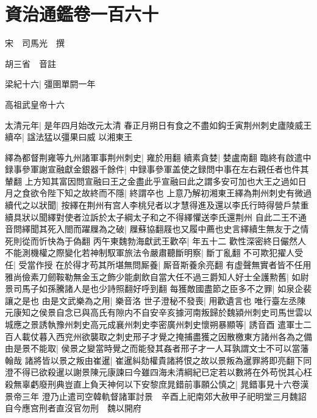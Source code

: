 \section{資治通鑑卷一百六十}
宋　司馬光　撰

胡三省　音註

梁紀十六|{
	彊圉單閼一年}


高祖武皇帝十六

太清元年|{
	是年四月始改元太清}
春正月朔日有食之不盡如鈎壬寅荆州刺史廬陵威王續卒|{
	諡法猛以彊果曰威}
以湘東王

繹為都督荆雍等九州諸軍事荆州刺史|{
	雍於用翻}
續素貪婪|{
	婪盧南翻}
臨終有啟遣中録事參軍謝宣融獻金銀器千餘件|{
	中録事參軍盖使之録問中事在左右親任者也件其輦翻}
上方知其富因問宣融曰王之金盡此乎宣融曰此之謂多安可加也大王之過如日月之食欲令陛下知之故終而不隱|{
	終謂卒也}
上意乃解初湘東王繹為荆州刺史有微過續代之以狀聞|{
	按繹在荆州有宫人李桃兒者以才慧得進及還以李氏行時得營戶禁重續具狀以聞繹對使者泣訴於太子綱太子和之不得繹懼送李氏還荆州}
自此二王不通音問繹聞其死入閤而躍屧為之破|{
	屧蘇協翻屐也又履中薦也史言繹續生無友于之情死則從而忻快為于偽翻}
丙午東魏勃海獻武王歡卒|{
	年五十二}
歡性深密終日儼然人不能測機權之際變化若神制馭軍旅法令嚴肅聽斷明察|{
	斷丁亂翻}
不可欺犯擢人受任|{
	受當作授}
在於得才苟其所堪無問厮養|{
	厮音斯養余亮翻}
有虚聲無實者皆不任用雅尚儉素刀劒鞍勒無金玉之飾少能劇飲自當大任不過三爵知人好士全護勲舊|{
	如尉景司馬子如孫騰諸人是也少詩照翻好呼到翻}
每獲敵國盡節之臣多不之罪|{
	如泉企裴讓之是也}
由是文武樂為之用|{
	樂音洛}
世子澄秘不發喪|{
	用歡遺言也}
唯行臺左丞陳元康知之侯景自念已與高氏有隙内不自安辛亥據河南叛歸於魏潁州刺史司馬世雲以城應之景誘執豫州刺史高元成襄州刺史李密廣州刺史懷朔暴顯等|{
	誘音酉}
遣軍士二百人載仗暮入西兖州欲襲取之刺史邢子才覺之掩捕盡獲之因散檄東方諸州各為之備由是景不能取|{
	侯景之變當時覺之而能發其姦者邢子才一人耳孰謂文士不可以當藩翰哉}
諸將皆以景之叛由崔暹|{
	崔暹糾劾權貴諸將恨之故以景叛為暹罪將即亮翻下同}
澄不得已欲殺暹以謝景陳元康諫曰今雖四海未清綱紀已定若以數將在外苟悦其心枉殺無辜虧廢刑典豈直上負天神何以下安黎庶晁錯前事願公慎之|{
	晁錯事見十六卷漢景帝三年}
澄乃止遣司空韓軌督諸軍討景　辛酉上祀南郊大赦甲子祀明堂三月魏詔自今應宫刑者直沒官勿刑　魏以開府

